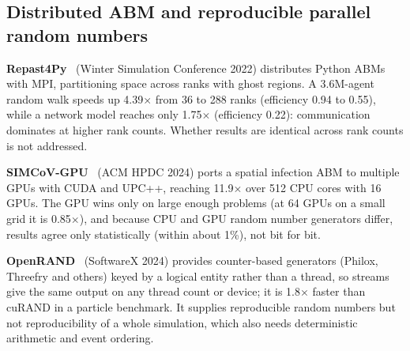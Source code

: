 \subsection{Distributed ABM and reproducible parallel random numbers}
\textbf{Repast4Py}~\cite{collier2022} (Winter Simulation Conference 2022) distributes Python ABMs
with MPI, partitioning space across ranks with ghost regions. A 3.6M-agent random walk speeds up
4.39$\times$ from 36 to 288 ranks (efficiency 0.94 to 0.55), while a network model reaches only
1.75$\times$ (efficiency 0.22): communication dominates at higher rank counts. Whether results are
identical across rank counts is not addressed.

\textbf{SIMCoV-GPU}~\cite{leyba2024} (ACM HPDC 2024) ports a spatial infection ABM to multiple GPUs
with CUDA and UPC++, reaching 11.9$\times$ over 512 CPU cores with 16 GPUs. The GPU wins only on
large enough problems (at 64 GPUs on a small grid it is 0.85$\times$), and because CPU and GPU
random number generators differ, results agree only statistically (within about 1\%), not bit for
bit.

\textbf{OpenRAND}~\cite{khan2024} (SoftwareX 2024) provides counter-based generators (Philox,
Threefry and others) keyed by a logical entity rather than a thread, so streams give the same
output on any thread count or device; it is 1.8$\times$ faster than cuRAND in a particle
benchmark. It supplies reproducible random numbers but not reproducibility of a whole simulation,
which also needs deterministic arithmetic and event ordering.

